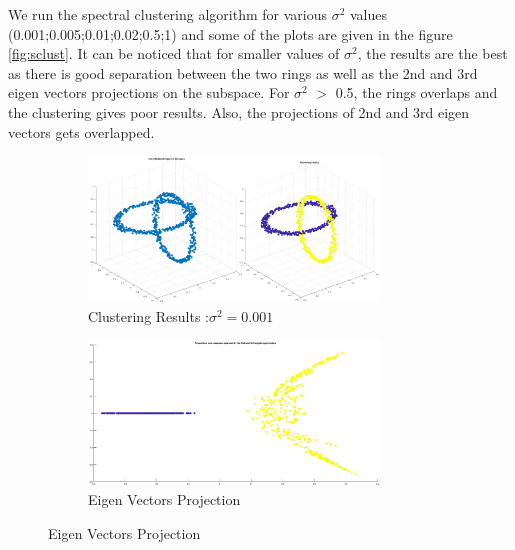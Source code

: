 We run the spectral clustering algorithm for various $\sigma^2$ values (0.001;0.005;0.01;0.02;0.5;1) and some of the plots are given in the figure \ref{fig:sclust}. It can be noticed that for smaller values of $\sigma^2$, the results are the best as there is good separation between the two rings as  well as the 2nd and 3rd eigen vectors projections on the subspace. For $\sigma^2$ $>$ 0.5, the rings overlaps and the clustering gives poor results. Also, the projections of 2nd and 3rd eigen vectors  gets overlapped. 
\begin{figure}[ht]
	\centering
	\begin{subfigure}[b]{0.32\textwidth}
		\centering
		\includegraphics[height= 0.55\textwidth, width = 0.85\textwidth]{Exercise3/Report/sclust_sig_0.001.jpg}
		\caption{Clustering Results :$\sigma^2 = 0.001$ }\label{fig:sclust_sig_0.001}
	\end{subfigure}%
	\begin{subfigure}[b]{0.32\textwidth}
		\centering
		\includegraphics[height= 0.55\textwidth, width = 0.85\textwidth]{Exercise3/Report/sclust_sig_0.001_1}
		\caption{Eigen Vectors Projection}\label{fig:sclust_sig_0.001_1}
	\end{subfigure}%

\end{figure}
